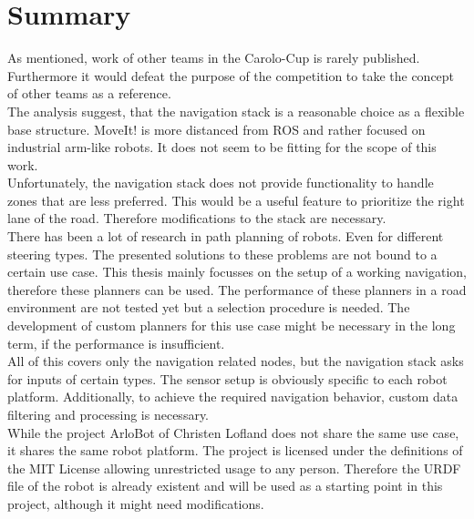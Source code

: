 \section{Summary}
As mentioned, work of other teams in the Carolo-Cup is rarely published. Furthermore it would defeat the purpose of the competition to take the concept of other teams as a reference.\\

The analysis suggest, that the navigation stack is a reasonable choice as a flexible base structure. MoveIt! is more distanced from ROS and rather focused on industrial arm-like robots. It does not seem to be fitting for the scope of this work.\\

Unfortunately, the navigation stack does not provide functionality to handle zones that are less preferred. This would be a useful feature to prioritize the right lane of the road. Therefore modifications to the stack are necessary.\\


There has been a lot of research in path planning of robots. Even for different steering types. The presented solutions to these problems are not bound to a certain use case.
This thesis mainly focusses on the setup of a working navigation, therefore these planners can be used. The performance of these planners in a road environment are not tested yet but a selection procedure is needed. The development of custom planners for this use case might be necessary in the long term, if the performance is insufficient.\\

All of this covers only the navigation related nodes, but the navigation stack asks for inputs of certain types. The sensor setup is obviously specific to each robot platform. Additionally, to achieve the required navigation behavior, custom data filtering and processing is necessary.\\


While the project ArloBot of Christen Lofland does not share the same use case, it shares the same robot platform. The project is licensed under the definitions of the MIT License allowing unrestricted usage to any person. Therefore the URDF file of the robot is already existent and will be used as a starting point in this project, although it might need modifications.












